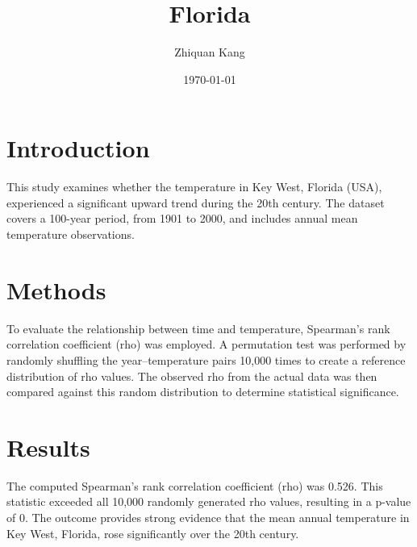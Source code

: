 \documentclass{article}
\title{\huge Florida}
\author{Zhiquan Kang}
\date{\today}
\begin{document}
\maketitle

\section{Introduction}

This study examines whether the temperature in Key West, Florida (USA), experienced a significant upward trend during the 20th century. The dataset covers a 100-year period, from 1901 to 2000, and includes annual mean temperature observations.

\section{Methods}

To evaluate the relationship between time and temperature, Spearman's rank correlation coefficient (rho) was employed. A permutation test was performed by randomly shuffling the year–temperature pairs 10,000 times to create a reference distribution of rho values. The observed rho from the actual data was then compared against this random distribution to determine statistical significance.

\section{Results}

The computed Spearman's rank correlation coefficient (rho) was 0.526. This statistic exceeded all 10,000 randomly generated rho values, resulting in a p-value of 0. The outcome provides strong evidence that the mean annual temperature in Key West, Florida, rose significantly over the 20th century.
\end{document}
